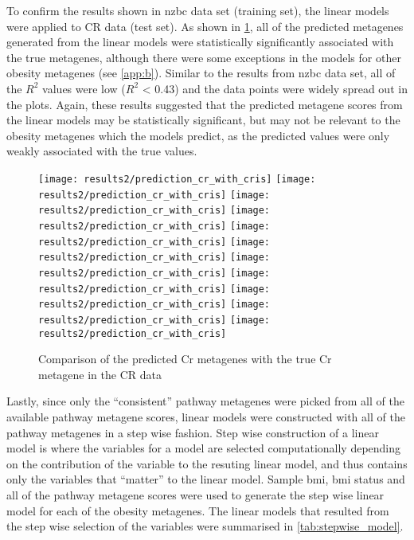 To confirm the results shown in \gls{nzbc} data set (training set), the linear models were applied to CR data (test set).
As shown in \cref{fig:predict_cr_cris}, all of the predicted metagenes generated from the linear models were statistically significantly associated with the true metagenes, although there were some exceptions in the models for other obesity metagenes (see \cref{app:b}).
Similar to the results from \gls{nzbc} data set, all of the $R^2$ values were low ($R^2$ \textless{} 0.43) and the data points were widely spread out in the plots.
Again, these results suggested that the predicted metagene scores from the linear models may be statistically significant, but may not be relevant to the obesity metagenes which the models predict, as the predicted values were only weakly associated with the true values.
\\

\begin{figure}[htpb]
	\centering
	\texttt{[image: results2/prediction\_cr\_with\_cris]}
	\texttt{[image: results2/prediction\_cr\_with\_cris]}
	\texttt{[image: results2/prediction\_cr\_with\_cris]}
	\texttt{[image: results2/prediction\_cr\_with\_cris]}
	\texttt{[image: results2/prediction\_cr\_with\_cris]}
	\texttt{[image: results2/prediction\_cr\_with\_cris]}
	\texttt{[image: results2/prediction\_cr\_with\_cris]}
	\texttt{[image: results2/prediction\_cr\_with\_cris]}
	\texttt{[image: results2/prediction\_cr\_with\_cris]}
	\texttt{[image: results2/prediction\_cr\_with\_cris]}
	\texttt{[image: results2/prediction\_cr\_with\_cris]}
	\caption{Comparison of the predicted Cr metagenes with the true Cr metagene in the CR data}
	\label{fig:predict_cr_cris}
\end{figure}

\noindent
Lastly, since only the ``consistent'' pathway metagenes were picked from all of the available pathway metagene scores, linear models were constructed with all of the pathway metagenes in a step wise fashion.
Step wise construction of a linear model is where the variables for a model are selected computationally depending on the contribution of the variable to the resuting linear model, and thus contains only the variables that ``matter'' to the linear model.
Sample \gls{bmi}, \gls{bmi} status and all of the pathway metagene scores were used to generate the step wise linear model for each of the obesity metagenes.
The linear models that resulted from the step wise selection of the variables were summarised in \cref{tab:stepwise_model}.

